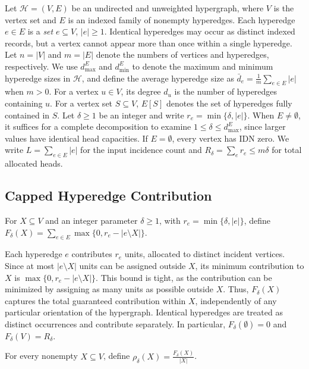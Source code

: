 \documentclass[twocolumn]{svjour3}
\begin{document}
Let $\mathcal{H}=(V,E)$ be an undirected and unweighted hypergraph, where $V$ is the vertex set and $E$ is an indexed family of nonempty hyperedges. Each hyperedge $e\in E$ is a \emph{set} $e\subseteq V$, $|e|\ge1$. Identical hyperedges may occur as distinct indexed records, but a vertex cannot appear more than once within a single hyperedge. Let $n=|V|$ and $m=|E|$ denote the numbers of vertices and hyperedges, respectively. We use $d^E_{\max}$ and $d^E_{\min}$ to denote the maximum and minimum hyperedge sizes in $\mathcal{H}$, and define the average hyperedge size as $\bar d_e=\frac{1}{m}\sum_{e\in E}|e|$ when $m>0$. For a vertex $u\in V$, its degree $d_u$ is the number of hyperedges containing $u$. For a vertex set $S\subseteq V$, $E[S]$ denotes the set of hyperedges fully contained in $S$. Let $\delta\ge1$ be an integer and write $r_e=\min\{\delta,|e|\}$. When $E\ne\emptyset$, it suffices for a complete decomposition to examine $1\le\delta\le d^E_{\max}$, since larger values have identical head capacities. If $E=\emptyset$, every vertex has IDN zero. We write $L=\sum_{e\in E}|e|$ for the input incidence count and $R_\delta=\sum_e r_e\le m\delta$ for total allocated heads. 



\subsection{Capped Hyperedge Contribution}
\begin{definition}\label{def:capped-hyperedge-contribution}
For $X\subseteq V$ and an integer parameter $\delta\ge1$, with $r_e=\min\{\delta,|e|\}$, define
$F_\delta(X)=\sum_{e\in E}\max\{0,r_e-|e\setminus X|\}$.
\end{definition}
Each hyperedge $e$ contributes $r_e$ units, allocated to distinct incident vertices. Since at most $|e\setminus X|$ units can be assigned outside $X$, its minimum contribution to $X$ is $\max\{0,r_e-|e\setminus X|\}$. This bound is tight, as the contribution can be minimized by assigning as many units as possible outside $X$. Thus, $F_\delta(X)$ captures the total guaranteed contribution within $X$, independently of any particular orientation of the hypergraph. Identical hyperedges are treated as distinct occurrences and contribute separately. In particular, $F_\delta(\emptyset)=0$ and $F_\delta(V)=R_\delta$.

\begin{definition}\label{density1}
For every nonempty $X\subseteq V$, define
$\rho_\delta(X)=\frac{F_\delta(X)}{|X|}$.
\end{definition}
\end{document}
